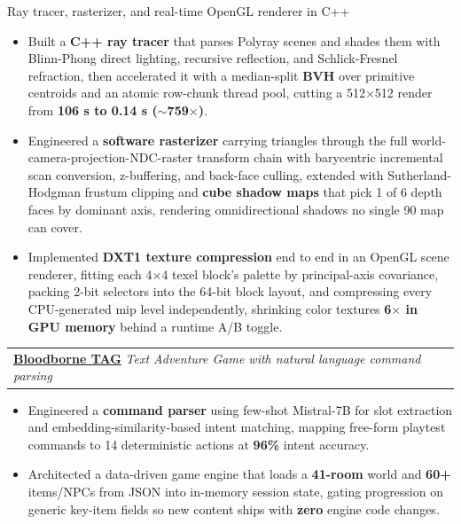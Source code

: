 \documentclass[letterpaper,11pt]{article}
\makeatletter
\newcommand{\BulletItems}[1]{
  \item
    \begin{itemize}[label={-}, leftmargin=*, labelsep=0.3em, topsep=0pt, partopsep=0pt, itemsep=0pt, parsep=0pt]
      \small #1
    \end{itemize}\vspace{-5pt}
}
\newcommand{\SLSubheadingItemLink}[4]{
  \vspace{-2pt}\item
    \begin{tabular*}{0.97\textwidth}[t]{l@{\extracolsep{\fill}}r}
      \textbf{\href{#2}{#1}} \textbar{} \textit{\small #3} & {\small #4} \\
    \end{tabular*}\vspace{-7pt}
}
\makeatother
\begin{document}
      {Ray tracer, rasterizer, and real-time OpenGL renderer in C++}{} %
    \BulletItems{
      \item Built a \textbf{C++ ray tracer} that parses Polyray scenes and shades them with Blinn-Phong direct lighting, recursive reflection, and Schlick-Fresnel refraction, then accelerated it with a median-split \textbf{BVH} over primitive centroids and an atomic row-chunk thread pool, cutting a 512$\times$512 render from \textbf{106 s to 0.14 s ($\sim$759$\times$)}.
      \item Engineered a \textbf{software rasterizer} carrying triangles through the full world-camera-projection-NDC-raster transform chain with barycentric incremental scan conversion, z-buffering, and back-face culling, extended with Sutherland-Hodgman frustum clipping and \textbf{cube shadow maps} that pick 1 of 6 depth faces by dominant axis, rendering omnidirectional shadows no single 90\textdegree{} map can cover.
      \item Implemented \textbf{DXT1 texture compression} end to end in an OpenGL scene renderer, fitting each 4$\times$4 texel block's palette by principal-axis covariance, packing 2-bit selectors into the 64-bit block layout, and compressing every CPU-generated mip level independently, shrinking color textures \textbf{6$\times$ in GPU memory} behind a runtime A/B toggle.
    }
    \SLSubheadingItemLink
      {Bloodborne TAG}{https://github.com/anupreetsingh/Bloodborne-TAG}
      {Text Adventure Game with natural language command parsing}{} %
    \BulletItems{
      \item Engineered a \textbf{command parser} using few-shot Mistral-7B for slot extraction and embedding-similarity-based intent matching, mapping free-form playtest commands to 14 deterministic actions at \textbf{96\%} intent accuracy.
      \item Architected a data-driven game engine that loads a \textbf{41-room} world and \textbf{60+} items/NPCs from JSON into in-memory session state, gating progression on generic key-item fields so new content ships with \textbf{zero} engine code changes.
    }
\end{document}
